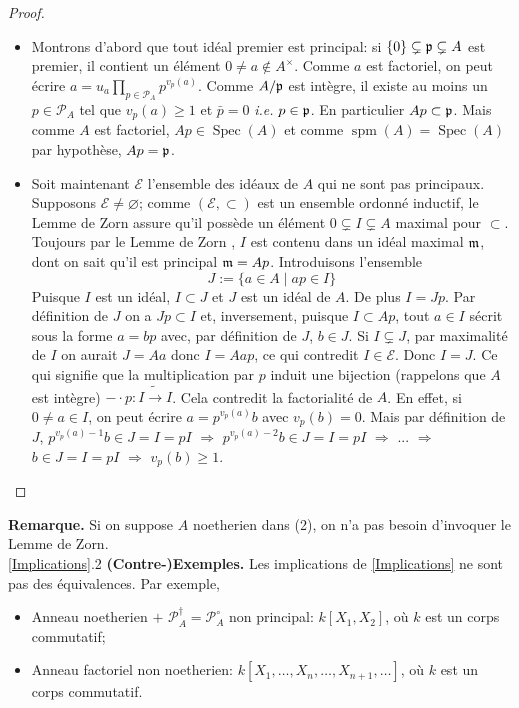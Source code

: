 \documentclass[a4paper, oneside, 12pt]{book}
\theoremstyle{theoremeStyle} %
\theoremstyle{definition} %
\newcommand{\ie}{\textit{i.e.}} %
\DeclareMathOperator{\Spec}{Spec}
\DeclareMathOperator{\spm}{spm}
\begin{document}
\begin{proof}
\begin{enumerate}[leftmargin=* ,parsep=0cm,itemsep=0cm,topsep=0cm]
\begin{itemize}[leftmargin=* ,parsep=0cm,itemsep=0cm,topsep=0cm]
\item Montrons d'abord que tout idéal premier est principal: si $\lbrace 0\rbrace\subsetneq \frak{p}\subsetneq A$ est premier, il contient un élément $0\not=a\notin A^\times$. Comme $a$ est factoriel, on peut écrire $a=u_a\prod_{p\in \mathcal{P}_A}p^{v_p(a)}$. Comme $A/\frak{p}$ est intègre, il existe au moins un $p\in \mathcal{P}_A$ tel que $v_p(a)\geq 1$ et  $\bar{p}=0$ \ie{} $p\in \frak{p}$. En particulier $Ap\subset \frak{p}$. Mais comme $A$ est factoriel, $Ap \in \Spec(A)$ et comme $\spm(A)=\Spec(A)$ par hypothèse, $Ap=\frak{p}$.\\
\item Soit maintenant $\mathcal{E}$ l'ensemble des idéaux de $A$ qui ne sont pas principaux. Supposons $\mathcal{E}\not=\varnothing$; comme $(\mathcal{E},\subset)$ est un ensemble ordonné inductif, le Lemme de Zorn assure qu'il possède un élément  $0\subsetneq I\subsetneq A$  maximal pour $\subset$. Toujours par le Lemme de Zorn , $I$  est contenu dans un idéal maximal $\frak{m}$, dont on sait qu'il est principal $\frak{m}=Ap$. Introduisons l'ensemble
$$J:=\lbrace a\in A\;|\; ap\in I\rbrace $$
Puisque $I$ est un idéal, $I\subset J$ et $J $ est un idéal de $A$. De plus $I=Jp$. Par définition de $J$ on a $Jp\subset I$ et, inversement, puisque $I\subset Ap$, tout $a\in I$ sécrit sous la forme $a=bp$ avec, par définition de $J$, $b\in J$. Si $I\subsetneq J$, par maximalité de $I$ on aurait $J=Aa$ donc $I=Aap$, ce qui contredit $I\in\mathcal{E}$. Donc $I=J$. Ce qui signifie que la multiplication par $p$ induit une bijection (rappelons que $A$ est intègre) $-\cdot p:I\tilde{\rightarrow} I$. Cela contredit la factorialité de $A$. En effet, si $0\not=a\in I$, on peut écrire $a=p^{v_p(a)}b$ avec $v_p(b)=0$. Mais   par définition de $J$, $p^{v_p(a)-1}b\in J=I=pI$ $\Rightarrow$ $p^{v_p(a)-2}b\in J=I=pI$ $\Rightarrow$ $...$ $\Rightarrow$ $b\in J=I=pI$ $\Rightarrow$ $v_p(b)\geq 1$.
\end{itemize}
\end{enumerate}
\end{proof}

\textbf{Remarque.} Si on suppose $A$ noetherien dans (2), on n'a pas besoin d'invoquer le Lemme de Zorn.\\

\ref{Implications}.2 \textbf{(Contre-)Exemples.} Les implications de \ref{Implications}  ne sont pas des équivalences. Par exemple,
\begin{itemize}[leftmargin=* ,parsep=0cm,itemsep=0cm,topsep=0cm]
\item Anneau noetherien $+$ $\mathcal{P}_A^\dag=\mathcal{P}_A^\circ$ non principal: $k[X_1,X_2]$, où $k$ est un corps commutatif;
\item Anneau factoriel  non noetherien: $k[X_1,\dots,X_n,\dots, X_{n+1},\dots]$, où $k$ est un corps commutatif.
\end{itemize}
\end{document}
